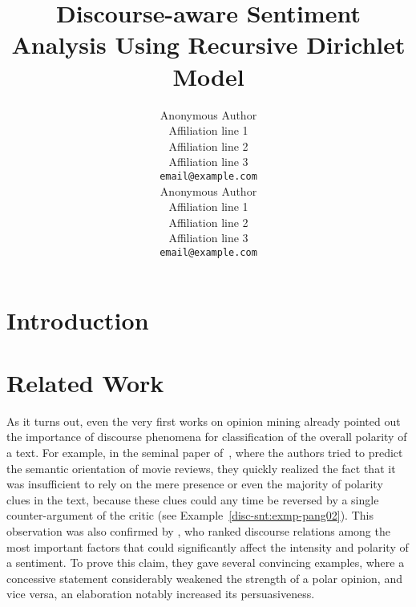 \documentclass[11pt]{article}
\title{Discourse-aware Sentiment Analysis Using Recursive Dirichlet
  Model}
\author{Anonymous Author\\
  Affiliation line 1 \\
  Affiliation line 2 \\
  Affiliation line 3 \\
  {\tt email@example.com} \\\And{}
  Anonymous Author\\
  Affiliation line 1 \\
  Affiliation line 2 \\
  Affiliation line 3 \\
  {\tt email@example.com} \\}
\date{}
\begin{document}
\maketitle
\begin{abstract}
\end{abstract}

\section{Introduction}\label{intro}


\section{Related Work}\label{relwork}



As it turns out, even the very first works on opinion mining already
pointed out the importance of discourse phenomena for classification
of the overall polarity of a text.  For example, in the seminal paper
of~, where the authors tried to predict the semantic
orientation of movie reviews, they quickly realized the fact that it
was insufficient to rely on the mere presence or even the majority of
polarity clues in the text, because these clues could any time be
reversed by a single counter-argument of the critic (see
Example~\ref{disc-snt:exmp-pang02}).  This observation was also
confirmed by , who ranked discourse relations among
the most important factors that could significantly affect the
intensity and polarity of a sentiment.  To prove this claim, they gave
several convincing examples, where a concessive statement considerably
weakened the strength of a polar opinion, and vice versa, an
elaboration notably increased its persuasiveness.
\end{document}

